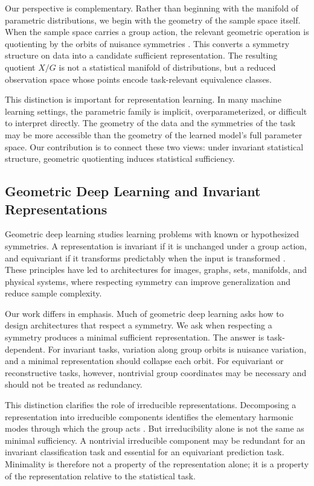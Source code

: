 \documentclass{ssl}
\begin{document}
Our perspective is complementary. Rather than beginning with the manifold of parametric distributions, we begin with the geometry of the sample space itself. When the sample space carries a group action, the relevant geometric operation is quotienting by the orbits of nuisance symmetries \cite{rosebrock_visual_2024,serre_linear_1977, sagan_symmetric_2001}. This converts a symmetry structure on data into a candidate sufficient representation. The resulting quotient $X/G$ is not a statistical manifold of distributions, but a reduced observation space whose points encode task-relevant equivalence classes.

This distinction is important for representation learning. In many machine learning settings, the parametric family is implicit, overparameterized, or difficult to interpret directly. The geometry of the data and the symmetries of the task may be more accessible than the geometry of the learned model's full parameter space. Our contribution is to connect these two views: under invariant statistical structure, geometric quotienting induces statistical sufficiency.

\subsection{Geometric Deep Learning and Invariant Representations}
Geometric deep learning studies learning problems with known or hypothesized symmetries. A representation is invariant if it is unchanged under a group action, and equivariant if it transforms predictably when the input is transformed \cite{rosebrock_visual_2024}. These principles have led to architectures for images, graphs, sets, manifolds, and physical systems, where respecting symmetry can improve generalization and reduce sample complexity.

Our work differs in emphasis. Much of geometric deep learning asks how to design architectures that respect a symmetry. We ask when respecting a symmetry produces a minimal sufficient representation. The answer is task-dependent. For invariant tasks, variation along group orbits is nuisance variation, and a minimal representation should collapse each orbit. For equivariant or reconstructive tasks, however, nontrivial group coordinates may be necessary and should not be treated as redundancy.

This distinction clarifies the role of irreducible representations. Decomposing a representation into irreducible components identifies the elementary harmonic modes through which the group acts \cite{greiner_quantum_1989, hall_lie_2015}. But irreducibility alone is not the same as minimal sufficiency. A nontrivial irreducible component may be redundant for an invariant classification task and essential for an equivariant prediction task. Minimality is therefore not a property of the representation alone; it is a property of the representation relative to the statistical task.
\end{document}

